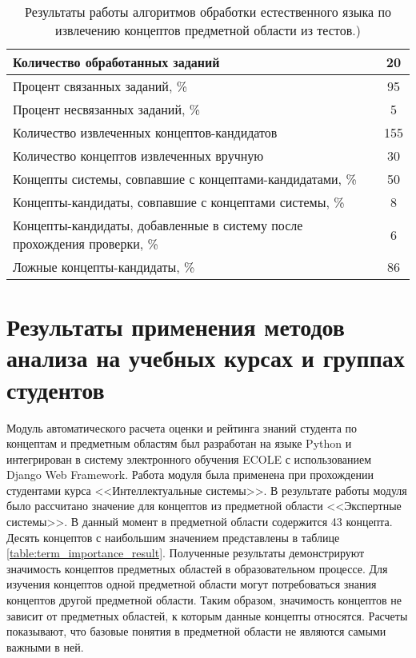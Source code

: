 \begin{table}[h!]
\centering
\caption{Результаты работы алгоритмов обработки естественного языка по извлечению концептов предметной области из тестов.)}
\label{table:nlp_resutls}
\begin{tabular}{ |p{12cm}|c|  }
\hline Количество обработанных заданий & 20 \\
\hline Процент связанных заданий, \% & 95 \\
\hline Процент несвязанных заданий, \% & 5 \\
\hline Количество извлеченных концептов-кандидатов & 155 \\
\hline Количество концептов извлеченных вручную & 30 \\
\hline Концепты системы, совпавшие с концептами-кандидатами, \% & 50 \\
\hline Концепты-кандидаты, совпавшие с концептами системы, \% & 8 \\
\hline Концепты-кандидаты, добавленные в систему после прохождения проверки, \%  & 6 \\
\hline Ложные концепты-кандидаты, \% & 86 \\
\hline
\end{tabular}
\end{table}  


\section{Результаты применения методов анализа на учебных курсах и группах студентов} \label{sect4_5}

Модуль автоматического расчета оценки и рейтинга знаний студента по концептам и предметным областям был разработан на языке Python и интегрирован в систему электронного обучения ECOLE с использованием Django Web Framework. Работа модуля была применена при прохождении студентами курса <<Интеллектуальные системы>>. В результате работы модуля было рассчитано значение для концептов из предметной области <<Экспертные системы>>. В данный момент в предметной области содержится 43 концепта. Десять концептов с наибольшим значением представлены в таблице \ref{table:term_importance_result}. Полученные результаты демонстрируют значимость концептов предметных областей в образовательном процессе. Для изучения концептов одной предметной области могут потребоваться знания концептов другой предметной области. Таким образом, значимость концептов не зависит от предметных областей, к которым данные концепты относятся. Расчеты показывают, что базовые понятия в предметной области не являются самыми важными в ней.    

